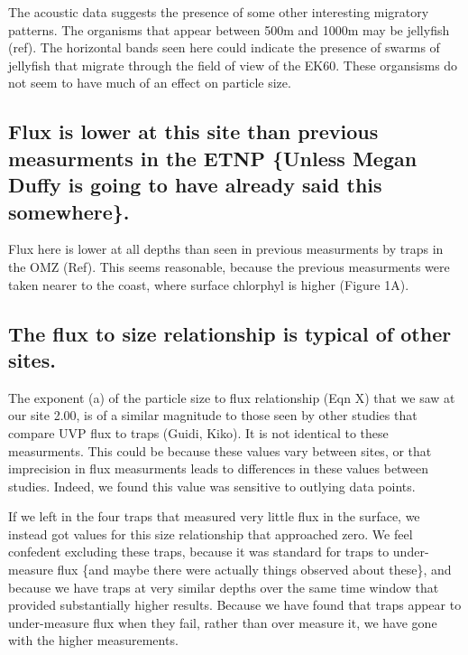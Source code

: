 \documentclass[]{article}
\begin{document}
The acoustic data suggests the presence of some other interesting
migratory patterns. The organisms that appear between 500m and 1000m may
be jellyfish (ref). The horizontal bands seen here could indicate the
presence of swarms of jellyfish that migrate through the field of view
of the EK60. These organsisms do not seem to have much of an effect on
particle size.

\hypertarget{flux-is-lower-at-this-site-than-previous-measurments-in-the-etnp-unless-megan-duffy-is-going-to-have-already-said-this-somewhere.}{%
\subsection{Flux is lower at this site than previous measurments in the
ETNP \{Unless Megan Duffy is going to have already said this
somewhere\}.}\label{flux-is-lower-at-this-site-than-previous-measurments-in-the-etnp-unless-megan-duffy-is-going-to-have-already-said-this-somewhere.}}

Flux here is lower at all depths than seen in previous measurments by
traps in the OMZ (Ref). This seems reasonable, because the previous
measurments were taken nearer to the coast, where surface chlorphyl is
higher (Figure 1A).

\hypertarget{the-flux-to-size-relationship-is-typical-of-other-sites.}{%
\subsection{The flux to size relationship is typical of other
sites.}\label{the-flux-to-size-relationship-is-typical-of-other-sites.}}

The exponent (a) of the particle size to flux relationship (Eqn X) that
we saw at our site 2.00, is of a similar magnitude to those seen by
other studies that compare UVP flux to traps (Guidi, Kiko). It is not
identical to these measurments. This could be because these values vary
between sites, or that imprecision in flux measurments leads to
differences in these values between studies. Indeed, we found this value
was sensitive to outlying data points.

If we left in the four traps that measured very little flux in the
surface, we instead got values for this size relationship that
approached zero. We feel confedent excluding these traps, because it was
standard for traps to under-measure flux \{and maybe there were actually
things observed about these\}, and because we have traps at very similar
depths over the same time window that provided substantially higher
results. Because we have found that traps appear to under-measure flux
when they fail, rather than over measure it, we have gone with the
higher measurements.
\end{document}
